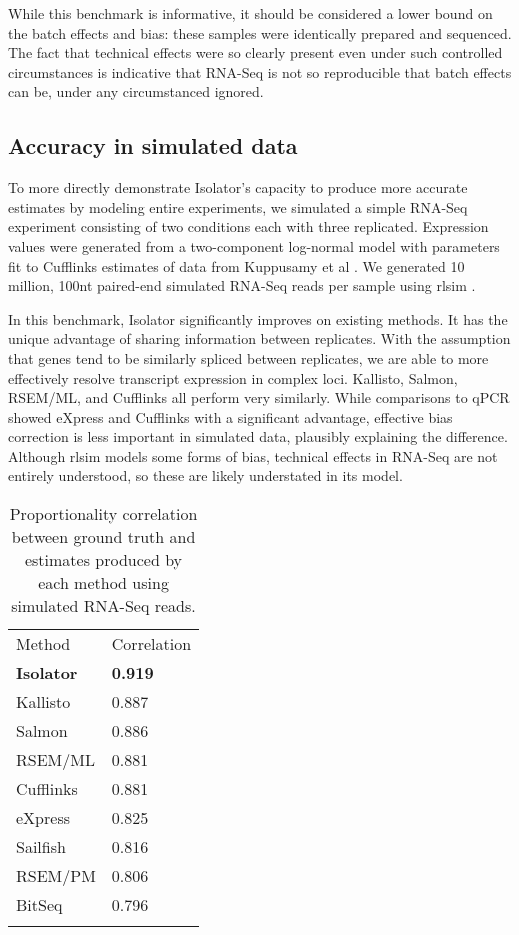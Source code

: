 \documentclass[twocolumn]{article}
\begin{document}
While this benchmark is informative, it should be considered a lower bound on
the batch effects and bias: these samples were identically prepared and
sequenced. The fact that technical effects were so clearly present even under
such controlled circumstances is indicative that RNA-Seq is not so reproducible
that batch effects can be, under any circumstanced ignored.

\subsection{Accuracy in simulated data}\label{accuracy-in-simulated-data}

To more directly demonstrate Isolator's capacity to produce more accurate
estimates by modeling entire experiments, we simulated a simple RNA-Seq
experiment consisting of two conditions each with three replicated. Expression
values were generated from a two-component log-normal model with parameters fit
to Cufflinks estimates of data from Kuppusamy et al \cite{Kuppusamy:2015ey}. We
generated 10 million, 100nt paired-end simulated RNA-Seq reads per sample using
rlsim \cite{Sipos:2013tz}.

In this benchmark, Isolator significantly improves on existing methods.
It has the unique advantage of sharing information between replicates.
With the assumption that genes tend to be similarly spliced between
replicates, we are able to more effectively resolve transcript
expression in complex loci. Kallisto, Salmon, RSEM/ML, and Cufflinks all
perform very similarly. While comparisons to qPCR showed eXpress and
Cufflinks with a significant advantage, effective bias correction is
less important in simulated data, plausibly explaining the difference.
Although rlsim models some forms of bias, technical effects in RNA-Seq
are not entirely understood, so these are likely understated in its model.

\begin{table}
\label{table:rlsim}
\begin{tabular}[c]{@{}ll@{}}
\toprule\addlinespace
Method & Correlation
\\\addlinespace
\midrule
\textbf{Isolator} & \textbf{0.919}
\\\addlinespace
Kallisto & 0.887
\\\addlinespace
Salmon & 0.886
\\\addlinespace
RSEM/ML & 0.881
\\\addlinespace
Cufflinks & 0.881
\\\addlinespace
eXpress & 0.825
\\\addlinespace
Sailfish & 0.816
\\\addlinespace
RSEM/PM & 0.806
\\\addlinespace
BitSeq & 0.796
\\\addlinespace
\bottomrule
\addlinespace
\end{tabular}
\caption{
Proportionality correlation between ground truth and estimates
produced by each method using simulated RNA-Seq reads.}
\end{table}
\end{document}
